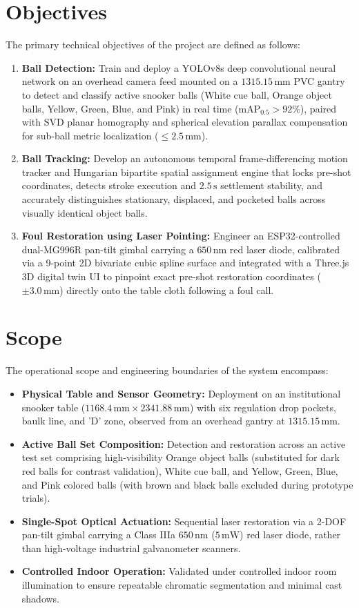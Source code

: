 \section{Objectives}
The primary technical objectives of the project are defined as follows:
\begin{enumerate}
    \item[\textbf{O1.}] \textbf{Ball Detection:} Train and deploy a YOLOv8s deep convolutional neural network on an overhead camera feed mounted on a $1315.15\,\text{mm}$ PVC gantry to detect and classify active snooker balls (White cue ball, Orange object balls, Yellow, Green, Blue, and Pink) in real time ($\text{mAP}_{0.5} > 92\%$), paired with SVD planar homography and spherical elevation parallax compensation for sub-ball metric localization ($\le 2.5\,\text{mm}$).
    \item[\textbf{O2.}] \textbf{Ball Tracking:} Develop an autonomous temporal frame-differencing motion tracker and Hungarian bipartite spatial assignment engine that locks pre-shot coordinates, detects stroke execution and $2.5\,\text{s}$ settlement stability, and accurately distinguishes stationary, displaced, and pocketed balls across visually identical object balls.
    \item[\textbf{O3.}] \textbf{Foul Restoration using Laser Pointing:} Engineer an ESP32-controlled dual-MG996R pan-tilt gimbal carrying a $650\,\text{nm}$ red laser diode, calibrated via a 9-point 2D bivariate cubic spline surface and integrated with a Three.js 3D digital twin UI to pinpoint exact pre-shot restoration coordinates ($\pm 3.0\,\text{mm}$) directly onto the table cloth following a foul call.
\end{enumerate}

\section{Scope}
The operational scope and engineering boundaries of the system encompass:
\begin{itemize}
    \item \textbf{Physical Table and Sensor Geometry:} Deployment on an institutional snooker table ($1168.4\,\text{mm} \times 2341.88\,\text{mm}$) with six regulation drop pockets, baulk line, and 'D' zone, observed from an overhead gantry at $1315.15\,\text{mm}$.
    \item \textbf{Active Ball Set Composition:} Detection and restoration across an active test set comprising high-visibility Orange object balls (substituted for dark red balls for contrast validation), White cue ball, and Yellow, Green, Blue, and Pink colored balls (with brown and black balls excluded during prototype trials).
    \item \textbf{Single-Spot Optical Actuation:} Sequential laser restoration via a 2-DOF pan-tilt gimbal carrying a Class IIIa $650\,\text{nm}$ ($5\,\text{mW}$) red laser diode, rather than high-voltage industrial galvanometer scanners.
    \item \textbf{Controlled Indoor Operation:} Validated under controlled indoor room illumination to ensure repeatable chromatic segmentation and minimal cast shadows.
\end{itemize}

